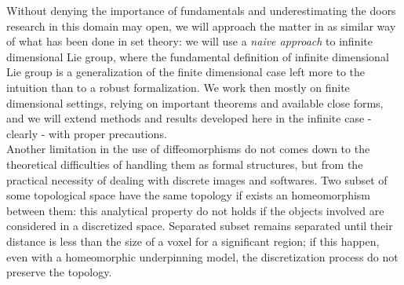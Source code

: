 Without denying the importance of fundamentals and underestimating the doors research in this domain may open, we will approach the matter in as similar way of what has been done in set theory: we will use a \emph{naive approach} to infinite dimensional Lie group, where the fundamental definition of infinite dimensional Lie group is a generalization of the finite dimensional case left more to the intuition than to a robust formalization. 
We work then mostly on finite dimensional settings, relying on important theorems and available close forms, and we will extend methods and results developed here in the infinite case -clearly - with proper precautions.\\

Another limitation in the use of diffeomorphisms do not comes down to the theoretical difficulties of handling them as formal structures, but from the practical necessity of dealing with discrete images and softwares. Two subset of some topological space have the same topology if exists an homeomorphism between them: this analytical property do not holds if the objects involved are considered in a discretized space. Separated subset remains separated until their distance is less than the size of a voxel for a significant region; if this happen, even with a homeomorphic underpinning model, the discretization process do not preserve the topology.\\


